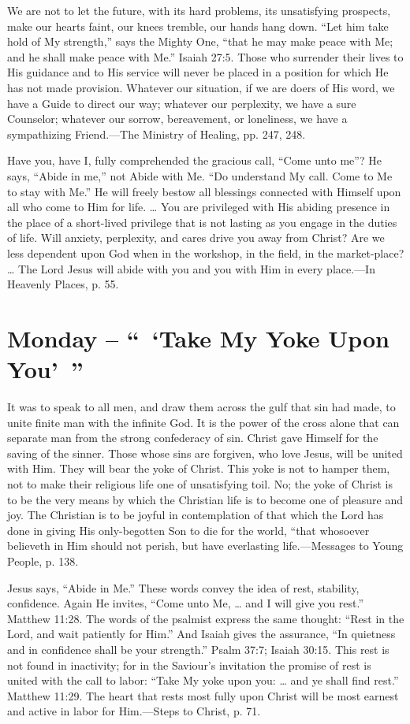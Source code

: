 \documentclass[a4paper, 10pt, twoside, headings=small]{scrartcl}
\begin{document}
\begin{multicols}{2}
We are not to let the future, with its hard problems, its unsatisfying prospects, make our hearts faint, our knees tremble, our hands hang down. “Let him take hold of My strength,” says the Mighty One, “that he may make peace with Me; and he shall make peace with Me.” Isaiah 27:5. Those who surrender their lives to His guidance and to His service will never be placed in a position for which He has not made provision. Whatever our situation, if we are doers of His word, we have a Guide to direct our way; whatever our perplexity, we have a sure Counselor; whatever our sorrow, bereavement, or loneliness, we have a sympathizing Friend.—The Ministry of Healing, pp. 247, 248.

Have you, have I, fully comprehended the gracious call, “Come unto me”? He says, “Abide in me,” not Abide with Me. “Do understand My call. Come to Me to stay with Me.” He will freely bestow all blessings connected with Himself upon all who come to Him for life. … You are privileged with His abiding presence in the place of a short-lived privilege that is not lasting as you engage in the duties of life. Will anxiety, perplexity, and cares drive you away from Christ? Are we less dependent upon God when in the workshop, in the field, in the market-place? … The Lord Jesus will abide with you and you with Him in every place.—In Heavenly Places, p. 55.

\section*{Monday – “ ‘Take My Yoke Upon You’ ”}

It was to speak to all men, and draw them across the gulf that sin had made, to unite finite man with the infinite God. It is the power of the cross alone that can separate man from the strong confederacy of sin. Christ gave Himself for the saving of the sinner. Those whose sins are forgiven, who love Jesus, will be united with Him. They will bear the yoke of Christ. This yoke is not to hamper them, not to make their religious life one of unsatisfying toil. No; the yoke of Christ is to be the very means by which the Christian life is to become one of pleasure and joy. The Christian is to be joyful in contemplation of that which the Lord has done in giving His only-begotten Son to die for the world, “that whosoever believeth in Him should not perish, but have everlasting life.—Messages to Young People, p. 138.

Jesus says, “Abide in Me.” These words convey the idea of rest, stability, confidence. Again He invites, “Come unto Me, … and I will give you rest.” Matthew 11:28. The words of the psalmist express the same thought: “Rest in the Lord, and wait patiently for Him.” And Isaiah gives the assurance, “In quietness and in confidence shall be your strength.” Psalm 37:7; Isaiah 30:15. This rest is not found in inactivity; for in the Saviour’s invitation the promise of rest is united with the call to labor: “Take My yoke upon you: … and ye shall find rest.” Matthew 11:29. The heart that rests most fully upon Christ will be most earnest and active in labor for Him.—Steps to Christ, p. 71.


\end{multicols}
\end{document}
